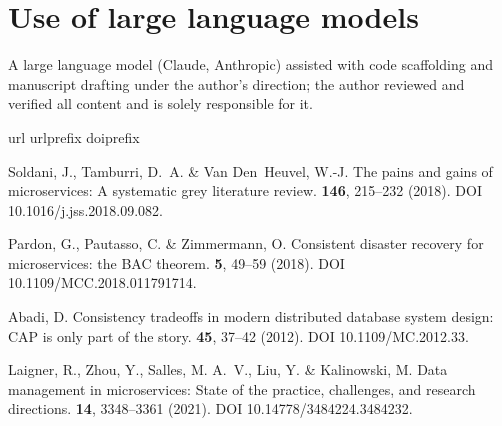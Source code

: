 \documentclass[fleqn,10pt]{wlscirep}
\begin{document}
\section*{Use of large language models}
A large language model (Claude, Anthropic) assisted with code scaffolding and manuscript drafting under
the author's direction; the author reviewed and verified all content and is solely responsible for it.

\begin{thebibliography}{10}
\expandafter\ifx\csname url\endcsname\relax
  \def\url#1{\texttt{#1}}\fi
\expandafter\ifx\csname urlprefix\endcsname\relax\def\urlprefix{URL }\fi
\expandafter\ifx\csname doiprefix\endcsname\relax\def\doiprefix{DOI }\fi
\providecommand{\bibinfo}[2]{#2}
\providecommand{\eprint}[2][]{\url{#2}}

\bibinfo{author}{Soldani, J.}, \bibinfo{author}{Tamburri, D.~A.} \&
  \bibinfo{author}{Van Den~Heuvel, W.-J.}
\newblock \bibinfo{journal}{\bibinfo{title}{The pains and gains of
  microservices: A systematic grey literature review}}.
  \textbf{\bibinfo{volume}{146}}, \bibinfo{pages}{215--232}
  (\bibinfo{year}{2018}).
\newblock \doiprefix 10.1016/j.jss.2018.09.082.

\bibinfo{author}{Pardon, G.}, \bibinfo{author}{Pautasso, C.} \&
  \bibinfo{author}{Zimmermann, O.}
\newblock \bibinfo{journal}{\bibinfo{title}{Consistent disaster recovery for
  microservices: the {BAC} theorem}}.
  \textbf{\bibinfo{volume}{5}}, \bibinfo{pages}{49--59} (\bibinfo{year}{2018}).
\newblock \doiprefix 10.1109/MCC.2018.011791714.

\bibinfo{author}{Abadi, D.}
\newblock \bibinfo{journal}{\bibinfo{title}{Consistency tradeoffs in modern
  distributed database system design: {CAP} is only part of the story}}.
 \textbf{\bibinfo{volume}{45}},
  \bibinfo{pages}{37--42} (\bibinfo{year}{2012}).
\newblock \doiprefix 10.1109/MC.2012.33.

\bibinfo{author}{Laigner, R.}, \bibinfo{author}{Zhou, Y.},
  \bibinfo{author}{Salles, M. A.~V.}, \bibinfo{author}{Liu, Y.} \&
  \bibinfo{author}{Kalinowski, M.}
\newblock \bibinfo{journal}{\bibinfo{title}{Data management in microservices:
  State of the practice, challenges, and research directions}}.
  \textbf{\bibinfo{volume}{14}}, \bibinfo{pages}{3348--3361}
  (\bibinfo{year}{2021}).
\newblock \doiprefix 10.14778/3484224.3484232.


\end{thebibliography}
\end{document}
